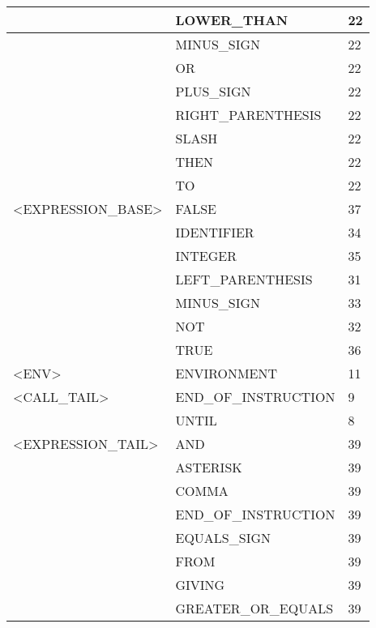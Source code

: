 \begin{longtable}{|l|l|l|}
                     &   LOWER\_THAN           &   22 \\ \hline
                     &   MINUS\_SIGN           &   22 \\ \hline
                     &   OR                   &   22 \\ \hline
                     &   PLUS\_SIGN            &   22 \\ \hline
                     &   RIGHT\_PARENTHESIS    &   22 \\ \hline
                     &   SLASH                &   22 \\ \hline
                     &   THEN                 &   22 \\ \hline
                     &   TO                   &   22 \\ \hline
<EXPRESSION\_BASE>    &   FALSE                &   37 \\ \hline
                     &   IDENTIFIER           &   34 \\ \hline
                     &   INTEGER              &   35 \\ \hline
                     &   LEFT\_PARENTHESIS     &   31 \\ \hline
                     &   MINUS\_SIGN           &   33 \\ \hline
                     &   NOT                  &   32 \\ \hline
                     &   TRUE                 &   36 \\ \hline
<ENV>                &   ENVIRONMENT          &   11 \\ \hline
<CALL\_TAIL>          &   END\_OF\_INSTRUCTION   &   9 \\ \hline
                     &   UNTIL                &   8 \\ \hline
<EXPRESSION\_TAIL>    &   AND                  &   39 \\ \hline
                     &   ASTERISK             &   39 \\ \hline
                     &   COMMA                &   39 \\ \hline
                     &   END\_OF\_INSTRUCTION   &   39 \\ \hline
                     &   EQUALS\_SIGN          &   39 \\ \hline
                     &   FROM                 &   39 \\ \hline
                     &   GIVING               &   39 \\ \hline
                     &   GREATER\_OR\_EQUALS    &   39 \\ \hline

\end{longtable}
